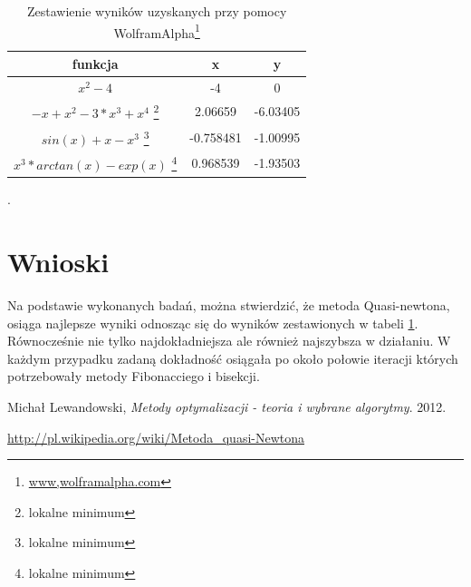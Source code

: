 \documentclass{classrep}
\begin{document}
 	\begin{table}[H]
		\begin{center}
		\begin{tabular}{|c|c|c|}
		\hline funkcja & x & y \\ 
\hline $x^2 - 4$ & -4 & 0 \\ 
\hline $-x + x^2 - 3*x^3 + x^4$ \footnote{lokalne minimum} & 2.06659 & -6.03405 \\ 
\hline $sin(x)+x-x^3$ \footnote{lokalne minimum} & -0.758481 & -1.00995 \\ 
\hline $x^3*arctan(x)-exp(x)$ \footnote{lokalne minimum} & 0.968539 & -1.93503 \\ 
\hline 
\end{tabular} 
				\caption{Zestawienie wyników uzyskanych przy pomocy WolframAlpha\footnote{\url{www,wolframalpha.com}}}.
		\end{center}
		\label{wolfram}
	\end{table}
	

\section{Wnioski}

Na podstawie wykonanych badań, można stwierdzić, że metoda Quasi-newtona, osiąga najlepsze wyniki odnosząc się do wyników zestawionych w tabeli \ref{wolfram}. Równocześnie nie tylko najdokładniejsza ale również najszybsza w działaniu. W każdym przypadku zadaną dokładność osiągała po około połowie iteracji których potrzebowały metody Fibonacciego i bisekcji. 


\begin{thebibliography}{0}
\item
  Michał Lewandowski,
  \emph{Metody optymalizacji - teoria i wybrane algorytmy}.
  2012.
  
\item \url{http://pl.wikipedia.org/wiki/Metoda_quasi-Newtona}
\end{thebibliography}
\end{document}
